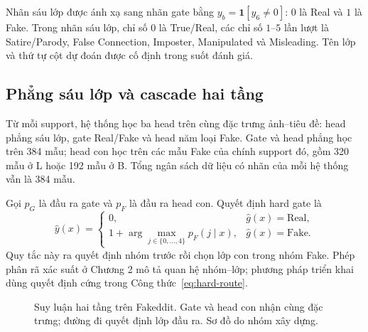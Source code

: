 \documentclass[12pt,a4paper]{article}
\newcommand{\BodySize}{13}
\newcommand{\BodyLeading}{15.6}
\newcommand{\BodyFont}{\fontsize{\BodySize}{\BodyLeading}\selectfont}
\numberwithin{figure}{section}
\numberwithin{table}{section}
\numberwithin{equation}{section}
\begin{document}
Nhãn sáu lớp được ánh xạ sang nhãn gate bằng $y_b=\mathbf1[y_6\ne0]$: $0$ là Real và $1$ là Fake. Trong nhãn sáu lớp, chỉ số $0$ là True/Real, các chỉ số $1$--$5$ lần lượt là Satire/Parody, False Connection, Imposter, Manipulated và Misleading. Tên lớp và thứ tự cột dự đoán được cố định trong suốt đánh giá.

\subsection{Phẳng sáu lớp và cascade hai tầng}
Từ mỗi support, hệ thống học ba head trên cùng đặc trưng ảnh--tiêu đề: head phẳng sáu lớp, gate Real/Fake và head năm loại Fake. Gate và head phẳng học trên 384 mẫu; head con học trên các mẫu Fake của chính support đó, gồm 320 mẫu ở L hoặc 192 mẫu ở B. Tổng ngân sách dữ liệu có nhãn của mỗi hệ thống vẫn là 384 mẫu.

Gọi $p_G$ là đầu ra gate và $p_F$ là đầu ra head con. Quyết định hard gate là
\begin{equation}
\widehat y(x)=
\begin{cases}
0,&\widehat g(x)=\mathrm{Real},\\
1+\arg\max_{j\in\{0,\ldots,4\}}p_F(j\mid x),&\widehat g(x)=\mathrm{Fake}.
\end{cases}
\label{eq:hard-route}
\end{equation}
Quy tắc này ra quyết định nhóm trước rồi chọn lớp con trong nhóm Fake. Phép phân rã xác suất ở Chương 2 mô tả quan hệ nhóm--lớp; phương pháp triển khai dùng quyết định cứng trong Công thức~\ref{eq:hard-route}.

\begin{figure}[H]\centering
{}
\caption{Suy luận hai tầng trên Fakeddit. Gate và head con nhận cùng đặc trưng; đường đi quyết định lớp đầu ra. Sơ đồ do nhóm xây dựng.}
\label{fig:cascade}
\end{figure}
\end{document}
